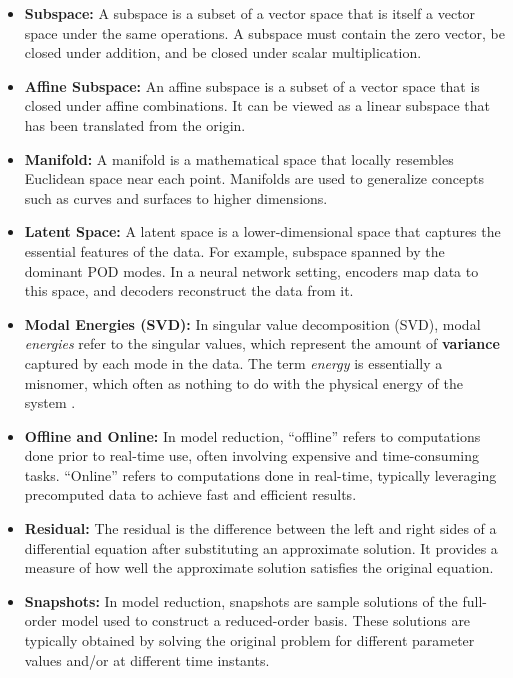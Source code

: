 \documentclass[11pt]{article}
\begin{document}
\begin{itemize}
    \item \textbf{Subspace:} A subspace is a subset of a vector space that is itself a vector space under the same operations. A subspace must contain the zero vector, be closed under addition, and be closed under scalar multiplication.

    \item \textbf{Affine Subspace:} An affine subspace is a subset of a vector space that is closed under affine combinations. It can be viewed as a linear subspace that has been translated from the origin.

    \item \textbf{Manifold:} A manifold is a mathematical space that locally resembles Euclidean space near each point. Manifolds are used to generalize concepts such as curves and surfaces to higher dimensions.

    \item \textbf{Latent Space:} A latent space is a lower-dimensional space that captures the essential features of the data. For example, subspace spanned by the dominant POD modes. In a neural network setting, encoders map data to this space, and decoders reconstruct the data from it.

    \item \textbf{Modal Energies (SVD):} In singular value decomposition (SVD), modal \textit{energies} refer to the singular values, which represent the amount of \textbf{variance} captured by each mode in the data. The term \textit{energy} is essentially a misnomer, which often as nothing to do with the physical energy of the system \cite{bhattacharyya2020energy}.

    \item \textbf{Offline and Online:} In model reduction, ``offline'' refers to computations done prior to real-time use, often involving expensive and time-consuming tasks. ``Online'' refers to computations done in real-time, typically leveraging precomputed data to achieve fast and efficient results.

    \item \textbf{Residual:} The residual is the difference between the left and right sides of a differential equation after substituting an approximate solution. It provides a measure of how well the approximate solution satisfies the original equation.

    \item \textbf{Snapshots:} In model reduction, snapshots are sample solutions of the full-order model used to construct a reduced-order basis. These solutions are typically obtained by solving the original problem for different parameter values and/or at different time instants.


\end{itemize}
\end{document}
